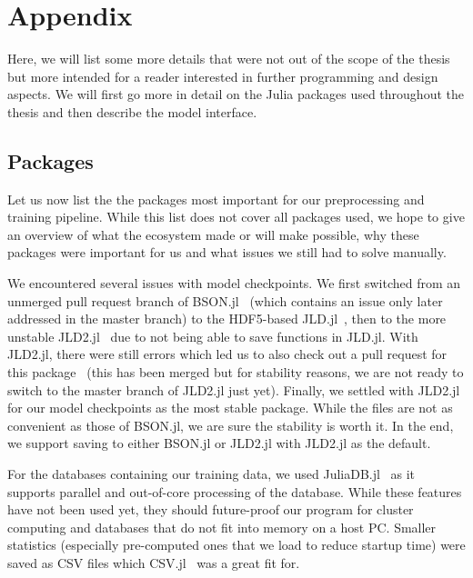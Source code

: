 \section{Appendix}

Here, we will list some more details that were not out of the scope of
the thesis but more intended for a reader interested in further
programming and design aspects. We will first go more in detail on the
Julia packages used throughout the thesis and then describe the model
interface.

\subsection{Packages}
\label{sec:packages}

Let us now list the the packages most important for our preprocessing
and training pipeline. While this list does not cover all packages
used, we hope to give an overview of what the ecosystem made or will
make possible, why these packages were important for us and what
issues we still had to solve manually.

We encountered several issues with model checkpoints. We first
switched from an unmerged pull request branch of
\mbox{BSON.jl}~\cite{JuliaIOBSONJl2019,SavingArrayLength} (which
contains an issue only later addressed in the master branch) to the
HDF5-based \mbox{JLD.jl}~\cite{JuliaIOJLDJl2019}, then to the more
unstable \mbox{JLD2.jl}~\cite{JuliaIOJLD2Jl2019} due to not being able
to save functions in \mbox{JLD.jl}. With \mbox{JLD2.jl}, there were
still errors which led us to also check out a pull request for this
package~\cite{MaybeFixTypename} (this has been merged but for
stability reasons, we are not ready to switch to the master branch of
\mbox{JLD2.jl} just yet). Finally, we settled with \mbox{JLD2.jl} for
our model checkpoints as the most stable package. While the files are
not as convenient as those of \mbox{BSON.jl}, we are sure the
stability is worth it. In the end, we support saving to either
\mbox{BSON.jl} or \mbox{JLD2.jl} with \mbox{JLD2.jl} as the default.

For the databases containing our training data, we used
\mbox{JuliaDB.jl}~\cite{JuliaComputingJuliaDBJl2019} as it supports
parallel and out-of-core processing of the database. While these
features have not been used yet, they should future-proof our program
for cluster computing and databases that do not fit into memory on a
host PC. Smaller statistics (especially pre-computed ones that we load
to reduce startup time) were saved as CSV files which
\mbox{CSV.jl}~\cite{JuliaDataCSVJl2019} was a great fit for.

